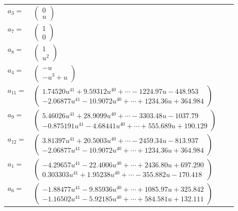\documentclass[1p]{elsarticle_modified}
\theoremstyle{definition}
\begin{document}
\begin{tabular}{m{7pt} m{180pt} m{7pt} m{180pt} }
\flushright $a_{3}=$&$\begin{pmatrix}0\\u\end{pmatrix}$ \\
\flushright $a_{7}=$&$\begin{pmatrix}1\\0\end{pmatrix}$ \\
\flushright $a_{8}=$&$\begin{pmatrix}1\\u^2\end{pmatrix}$ \\
\flushright $a_{4}=$&$\begin{pmatrix}- u\\- u^3+u\end{pmatrix}$ \\
\flushright $a_{11}=$&$\begin{pmatrix}1.74520 u^{41}+9.59312 u^{40}+\cdots-1224.97 u-448.953\\-2.06877 u^{41}-10.9072 u^{40}+\cdots+1234.36 u+364.984\end{pmatrix}$ \\
\flushright $a_{9}=$&$\begin{pmatrix}5.46026 u^{41}+28.9099 u^{40}+\cdots-3303.48 u-1037.79\\-0.875191 u^{41}-4.68441 u^{40}+\cdots+555.689 u+190.129\end{pmatrix}$ \\
\flushright $a_{12}=$&$\begin{pmatrix}3.81397 u^{41}+20.5003 u^{40}+\cdots-2459.34 u-813.937\\-2.06877 u^{41}-10.9072 u^{40}+\cdots+1234.36 u+364.984\end{pmatrix}$ \\
\flushright $a_{1}=$&$\begin{pmatrix}-4.29657 u^{41}-22.4006 u^{40}+\cdots+2436.80 u+697.290\\0.303303 u^{41}+1.95238 u^{40}+\cdots-355.882 u-170.418\end{pmatrix}$ \\
\flushright $a_{6}=$&$\begin{pmatrix}-1.88477 u^{41}-9.85936 u^{40}+\cdots+1085.97 u+325.842\\-1.16502 u^{41}-5.92185 u^{40}+\cdots+584.581 u+132.111\end{pmatrix}$ \\

\end{tabular}
\end{document}

